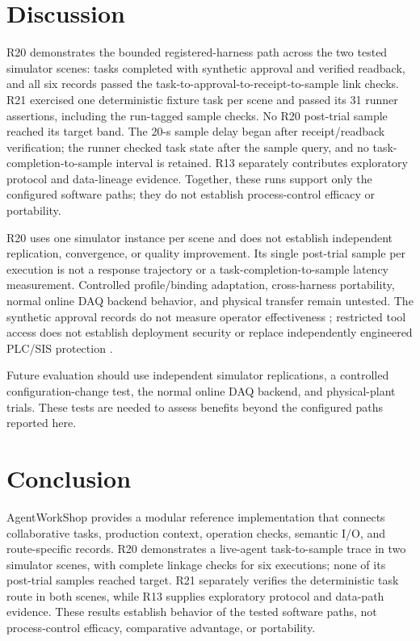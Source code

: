 \section{Discussion}
\label{sec:limits}
R20 demonstrates the bounded registered-harness path across the two tested
simulator scenes: tasks completed with synthetic approval and verified
readback, and all six records passed the task-to-approval-to-receipt-to-sample
link checks. R21 exercised one deterministic fixture task per scene and
passed its 31 runner assertions, including the run-tagged sample checks. No
R20 post-trial sample reached its target band. The 20-s sample delay began
after receipt/readback verification; the runner checked task state after the
sample query, and no task-completion-to-sample interval is retained. R13
separately contributes exploratory protocol and data-lineage evidence.
Together, these runs support only the configured software paths; they do not
establish process-control efficacy or portability.

R20 uses one simulator instance per scene and does not establish independent
replication, convergence, or quality improvement. Its single post-trial
sample per execution is not a response trajectory or a
task-completion-to-sample latency measurement. Controlled profile/binding
adaptation, cross-harness portability, normal online DAQ backend behavior, and
physical transfer remain untested. The synthetic approval records do not
measure operator effectiveness
\cite{parasuramanmanzey2010complacency,parasuraman2000model,bainbridge1983ironies};
restricted tool access does not establish deployment security
\cite{greshake2023injection,liu2024pinjection,iec62443-3-3} or replace
independently engineered PLC/SIS protection \cite{iec61511}.

Future evaluation should use independent simulator replications, a controlled
configuration-change test, the normal online DAQ backend, and physical-plant
trials. These tests are needed to assess benefits beyond the configured paths
reported here.

\section{Conclusion}
\label{sec:conclusion}
AgentWorkShop provides a modular reference implementation that connects
collaborative tasks, production context, operation checks, semantic I/O, and
route-specific records. R20 demonstrates a live-agent task-to-sample trace in
two simulator scenes, with complete linkage checks for six executions; none
of its post-trial samples reached target. R21 separately verifies the
deterministic task route in both scenes, while R13 supplies exploratory
protocol and data-path evidence. These results establish behavior of the
tested software paths, not process-control efficacy, comparative advantage,
or portability.
